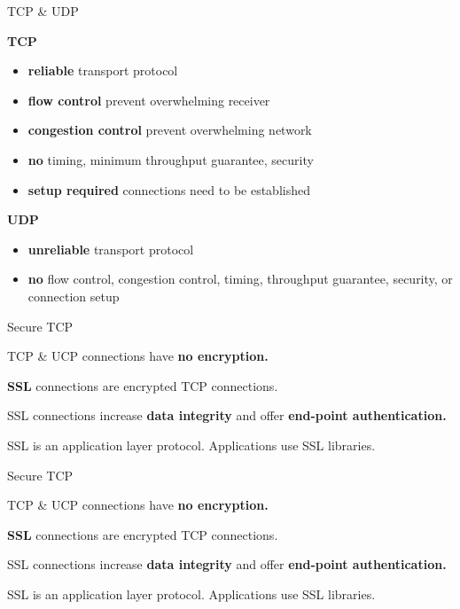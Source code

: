 \begin{topic}{TCP \& UDP}
\begin{multicols}{2}
\textbf{TCP}\\

\begin{itemize}
	\item \textbf{reliable} transport protocol
	\item \textbf{flow control} prevent overwhelming receiver
	\item \textbf{congestion control} prevent overwhelming network
	\item \textbf{no} timing, minimum throughput guarantee, security
	\item \textbf{setup required} connections need to be established
\end{itemize}

\columnbreak
\textbf{UDP}\\

\begin{itemize}
	\item \textbf{unreliable} transport protocol
	\item \textbf{no} flow control, congestion control, timing, throughput guarantee, security, or connection setup
\end{itemize}
\end{multicols}
\end{topic}

\begin{topic}{Secure TCP}

TCP \& UCP connections have \textbf{no encryption.}

\textbf{SSL} connections are encrypted TCP connections.

SSL connections increase \textbf{data integrity} and offer \textbf{end-point authentication.}

SSL is an application layer protocol. Applications use SSL libraries.

\end{topic}

\begin{topic}{Secure TCP}

TCP \& UCP connections have \textbf{no encryption.}

\textbf{SSL} connections are encrypted TCP connections.

SSL connections increase \textbf{data integrity} and offer \textbf{end-point authentication.}

SSL is an application layer protocol. Applications use SSL libraries.

\end{topic}